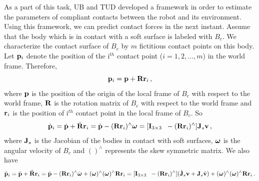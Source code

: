 As a part of this task, UB and TUD developed a framework in order to estimate
the parameters of compliant contacts between the robot and its environment.
Using this framework, we can predict contact forces in the next instant.
Assume that the body which is in contact with a soft surface is labeled with
$B_c$.  We characterize the contact surface of $B_c$ by $m$ fictitious contact
points on this body.  Let $\mathbf{p}_i$ denote the position of the i$^{th}$ contact
point ($i=1,2,\ldots,m$) in the world frame.  Therefore,
%
\begin{equation}
  \mathbf{p}_i = \mathbf{p} + \mathbf{R} \mathbf{r}_i \, ,
\end{equation}
%
where $\mathbf{p}$ is the position of the origin of the local frame of $B_c$ with
respect to the world frame, $\mathbf{R}$ is the rotation matrix of $B_c$ with respect
to the world frame and $\mathbf{r}_i$ is the position of i$^{th}$ contact point in
the local frame of $B_c$.  So
%
\begin{equation}
  \dot{\mathbf{p}}_i = \dot{\mathbf{p}} + \dot{\mathbf{R}} \mathbf{r}_i = \dot{\mathbf{p}} - (\mathbf{R}\mathbf{r}_i)^{\wedge}
  \boldsymbol{\omega} = [ \mathbf{I}_{3 \times 3} \; \; {}-(\mathbf{R}\mathbf{r}_i)^{\wedge} ] \mathbf{J}_s \mathbf{v} \, ,
  \label{pidot}
\end{equation}
%
where $\mathbf{J}_s$ is the Jacobian of the bodies in contact with soft surfaces,
$\boldsymbol{\omega}$ is the angular velocity of $B_c$ and $()^{\wedge}$ represents the
skew symmetric matrix.  We also have
%
\begin{equation}
  \ddot{\mathbf{p}}_i = \ddot{\mathbf{p}} + \ddot{\mathbf{R}} \mathbf{r}_i = \ddot{\mathbf{p}} - (\mathbf{R}
  \mathbf{r}_i)^{\wedge} \dot{\boldsymbol{\omega}} + (\boldsymbol{\omega})^{\wedge} (\boldsymbol{\omega})^{\wedge} \mathbf{R}
  \mathbf{r}_i = [ \mathbf{I}_{3 \times 3} \; \; {}-(\mathbf{R} \mathbf{r}_i)^{\wedge}] (\dot{\mathbf{J}}_s \mathbf{v} +
  \mathbf{J}_s \dot{\mathbf{v}}) + (\boldsymbol{\omega})^{\wedge} (\boldsymbol{\omega})^{\wedge} \mathbf{R} \mathbf{r}_i \, .
  \label{piddot}
\end{equation}
%

